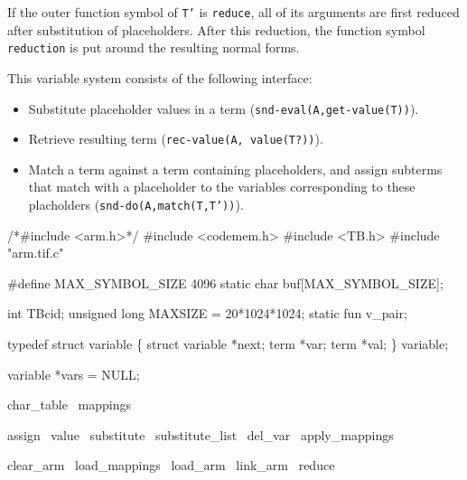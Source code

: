 If the outer function symbol of {\tt T'} is {\tt reduce}, all of its
arguments are first reduced after substitution of placeholders.
After this reduction, the function symbol {\tt reduction} is put around
the resulting normal forms.

This variable system consists of the following interface:
\begin{itemize}
\item Substitute placeholder values in a term ({\tt snd-eval(A,get-value(T))}).
\item Retrieve resulting term ({\tt rec-value(A, value(T?))}).
\item Match a term against a term containing placeholders, 
      and assign subterms that match with a placeholder
      to the variables corresponding to these placholders
      ({\tt snd-do(A,match(T,T'))}).
\end{itemize}


\endmoddef\let\nwnotused=\nwoutput{}
/*#include <arm.h>*/
#include <codemem.h>
#include <TB.h>
#include "arm.tif.c"

#define MAX_SYMBOL_SIZE 4096
static char buf[MAX_SYMBOL_SIZE];

int TBcid;
unsigned long MAXSIZE = 20*1024*1024;
static fun v_pair;

typedef struct variable
\{
  struct variable *next;
  term *var;
  term *val;
\} variable;

variable *vars = NULL;

\LA{}char_table~{\nwtagstyle{}}\RA{}
\LA{}mappings~{\nwtagstyle{}}\RA{}

\LA{}assign~{\nwtagstyle{}}\RA{}
\LA{}value~{\nwtagstyle{}}\RA{}
\LA{}substitute~{\nwtagstyle{}}\RA{}
\LA{}substitute_list~{\nwtagstyle{}}\RA{}
\LA{}del_var~{\nwtagstyle{}}\RA{}
\LA{}apply_mappings~{\nwtagstyle{}}\RA{}

\LA{}clear_arm~{\nwtagstyle{}}\RA{}
\LA{}load_mappings~{\nwtagstyle{}}\RA{}
\LA{}load_arm~{\nwtagstyle{}}\RA{}
\LA{}link_arm~{\nwtagstyle{}}\RA{}
\LA{}reduce~{\nwtagstyle{}}\RA{}

